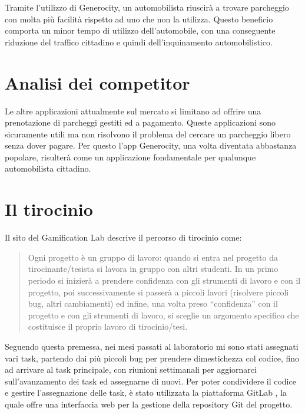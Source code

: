 \documentclass[main.tex]{subfiles}
\begin{document}
Tramite l'utilizzo di Generocity, un automobilista riuscirà a trovare parcheggio con molta più facilità rispetto ad uno che non la utilizza. 
Questo beneficio comporta un minor tempo di utilizzo dell'automobile, con una conseguente riduzione del traffico cittadino e quindi dell'inquinamento automobilistico.

\section{Analisi dei competitor}

Le altre applicazioni attualmente sul mercato si limitano ad offrire una prenotazione di parcheggi gestiti ed a pagamento. Queste applicazioni sono sicuramente utili ma non risolvono il problema del cercare un parcheggio libero senza dover pagare. Per questo l'app Generocity, una volta diventata abbastanza popolare, risulterà come un applicazione fondamentale per qualunque automobilista cittadino.


\section{Il tirocinio} \label{Tirocinio}

Il sito del Gamification Lab \cite{GamificationLab} descrive il percorso di tirocinio come:
\begin{quote}
Ogni progetto è un gruppo di lavoro: quando si entra nel progetto da tirocinante/tesista si lavora in gruppo con altri studenti. In un primo periodo si inizierà a prendere confidenza con gli strumenti di lavoro e con il progetto, poi successivamente si passerà a piccoli lavori (risolvere piccoli bug, altri cambiamenti) ed infine, una volta preso “confidenza” con il progetto e con gli strumenti di lavoro, si sceglie un argomento specifico che costituisce il proprio lavoro di tirocinio/tesi.\cite{percorso-tirocinio}
\end{quote}
Seguendo questa premessa, nei mesi passati al laboratorio mi sono stati assegnati vari task, partendo dai più piccoli bug per prendere dimestichezza col codice, fino ad arrivare al task principale, con riunioni settimanali per aggiornarci sull'avanzamento dei task ed assegnarne di nuovi. \newline
Per poter condividere il codice e gestire l'assegnazione delle task, è stato utilizzata la piattaforma GitLab \cite{GitLab}, la quale offre una interfaccia web per la gestione della repository Git \cite{Git} del progetto.
\end{document}
